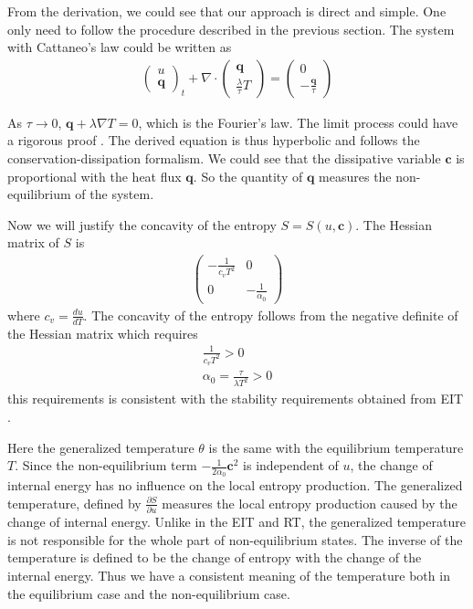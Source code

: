 \documentclass[a4paper]{article}
\begin{document}
From the derivation, we could see that our approach is direct and simple. One only need to follow the procedure described in the previous section. The system with Cattaneo's law could be written as
\begin{eqnarray}
\left( \begin{array}{ll} u \\ \mathbf{q} \end{array} \right)_t + \nabla \cdot \left( \begin{array}{ll} \mathbf{q} \\ \frac{\lambda}{\tau} T \end{array} \right) =\left( \begin{array}{ll} 0 \\ -\frac{\mathbf{q}}{\tau} \end{array} \right) 
\end{eqnarray}

As $\tau \rightarrow 0$, $\mathbf{q}+\lambda \nabla T=0$, which is the Fourier's law. The limit process could have a rigorous proof \cite{yong2008interesting}.
The derived equation is thus hyperbolic and follows the conservation-dissipation formalism. We could see that the dissipative variable $\mathbf{c}$ is proportional with the heat flux $\mathbf{q}$. So the quantity of  $\mathbf{q}$ measures the non-equilibrium of the system.

Now we will justify the concavity of the entropy $S=S(u,\mathbf{c})$. The Hessian matrix of $S$ is
\begin{eqnarray}
\left( \begin{array}{ll} -\frac{1}{c_v T^2} & 0 \\ 0 & -\frac{1}{\alpha_0} \end{array} \right)
\end{eqnarray}
where $c_v=\frac{d u}{d T}$.
The concavity of the entropy follows from the negative definite of the Hessian matrix which requires 
\begin{eqnarray}
\frac{1}{c_v T^2}>0 \\
\alpha_0=\frac{\tau}{\lambda T^2}>0
\end{eqnarray}
this requirements is consistent with the stability requirements obtained from EIT \cite{Jou1996extended}.

Here the generalized temperature $\theta$ is the same with the equilibrium temperature $T$. Since the non-equilibrium term $-\frac{1}{2\alpha_0}\mathbf{c}^2$ is independent of $u$, the change of internal energy has no influence on the local entropy production. The generalized temperature, defined by $\frac{\partial S}{\partial u}$ measures the local entropy production caused by the change of internal energy. Unlike in the EIT and RT, the generalized temperature is not responsible for the whole part of non-equilibrium states. The inverse of the temperature is defined to be the change of entropy with the change of the internal energy. Thus we have a consistent meaning of the temperature both in the equilibrium case and the non-equilibrium case.
\end{document}
